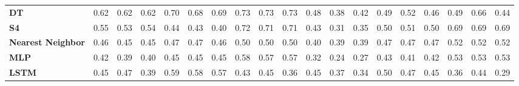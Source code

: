 \begin{table}[t]
{\begin{tabular}{l ccc ccc ccc ccc ccc ccc}
\textbf{DT} & \cellcolor[HTML]{A8D250}0.62 & \cellcolor[HTML]{A9D250}0.62 & \cellcolor[HTML]{A8D250}0.62 & \cellcolor[HTML]{77D05D}0.70 & \cellcolor[HTML]{82D05A}0.68 & \cellcolor[HTML]{7ED05B}0.69 & \cellcolor[HTML]{5FCF63}0.73 & \cellcolor[HTML]{5FCF63}0.73 & \cellcolor[HTML]{60CF62}0.73 & \cellcolor[HTML]{FFCA3F}0.48 & \cellcolor[HTML]{FFA152}0.38 & \cellcolor[HTML]{FFB24A}0.42 & \cellcolor[HTML]{FFD03D}0.49 & \cellcolor[HTML]{F0D43F}0.52 & \cellcolor[HTML]{FFC442}0.46 & \cellcolor[HTML]{FFCF3D}0.49 & \cellcolor[HTML]{8FD157}0.66 & \cellcolor[HTML]{FFB947}0.44 \\
\textbf{S4} & \cellcolor[HTML]{DBD344}0.55 & \cellcolor[HTML]{E7D341}0.53 & \cellcolor[HTML]{E3D342}0.54 & \cellcolor[HTML]{FFBC46}0.44 & \cellcolor[HTML]{FFB549}0.43 & \cellcolor[HTML]{FFAA4E}0.40 & \cellcolor[HTML]{68D060}0.72 & \cellcolor[HTML]{6BD060}0.71 & \cellcolor[HTML]{6BD060}0.71 & \cellcolor[HTML]{FFB947}0.43 & \cellcolor[HTML]{FF855F}0.31 & \cellcolor[HTML]{FF9658}0.35 & \cellcolor[HTML]{FED43B}0.50 & \cellcolor[HTML]{F8D43D}0.51 & \cellcolor[HTML]{FDD43C}0.50 & \cellcolor[HTML]{7BD05C}0.69 & \cellcolor[HTML]{7BD05C}0.69 & \cellcolor[HTML]{7DD05B}0.69 \\
\textbf{Nearest Neighbor} & \cellcolor[HTML]{FFC243}0.46 & \cellcolor[HTML]{FFBD45}0.45 & \cellcolor[HTML]{FFBE45}0.45 & \cellcolor[HTML]{FFC841}0.47 & \cellcolor[HTML]{FFC741}0.47 & \cellcolor[HTML]{FFC442}0.46 & \cellcolor[HTML]{FCD43C}0.50 & \cellcolor[HTML]{FFD33C}0.50 & \cellcolor[HTML]{FFD33B}0.50 & \cellcolor[HTML]{FFAB4E}0.40 & \cellcolor[HTML]{FFA74F}0.39 & \cellcolor[HTML]{FFA84F}0.39 & \cellcolor[HTML]{FFC542}0.47 & \cellcolor[HTML]{FFC841}0.47 & \cellcolor[HTML]{FFC642}0.47 & \cellcolor[HTML]{F1D43E}0.52 & \cellcolor[HTML]{F4D43E}0.52 & \cellcolor[HTML]{F3D43E}0.52 \\
\textbf{MLP} & \cellcolor[HTML]{FFB34A}0.42 & \cellcolor[HTML]{FFA74F}0.39 & \cellcolor[HTML]{FFAB4E}0.40 & \cellcolor[HTML]{FFBF45}0.45 & \cellcolor[HTML]{FFBE45}0.45 & \cellcolor[HTML]{FFBE45}0.45 & \cellcolor[HTML]{C9D248}0.58 & \cellcolor[HTML]{CED347}0.57 & \cellcolor[HTML]{CCD348}0.57 & \cellcolor[HTML]{FF8A5D}0.32 & \cellcolor[HTML]{FF6B6B}0.24 & \cellcolor[HTML]{FF7467}0.27 & \cellcolor[HTML]{FFB649}0.43 & \cellcolor[HTML]{FFAF4C}0.41 & \cellcolor[HTML]{FFB14B}0.42 & \cellcolor[HTML]{EDD33F}0.53 & \cellcolor[HTML]{EAD340}0.53 & \cellcolor[HTML]{EDD33F}0.53 \\
\textbf{LSTM} & \cellcolor[HTML]{FFC044}0.45 & \cellcolor[HTML]{FFC940}0.47 & \cellcolor[HTML]{FFA84F}0.39 & \cellcolor[HTML]{C3D24A}0.59 & \cellcolor[HTML]{C6D249}0.58 & \cellcolor[HTML]{CCD348}0.57 & \cellcolor[HTML]{FFB649}0.43 & \cellcolor[HTML]{FFC044}0.45 & \cellcolor[HTML]{FF9A55}0.36 & \cellcolor[HTML]{FFC044}0.45 & \cellcolor[HTML]{FF9C54}0.37 & \cellcolor[HTML]{FF915A}0.34 & \cellcolor[HTML]{FFD33C}0.50 & \cellcolor[HTML]{FFC840}0.47 & \cellcolor[HTML]{FFBF45}0.45 & \cellcolor[HTML]{FF9856}0.36 & \cellcolor[HTML]{FFBC46}0.44 & \cellcolor[HTML]{FF7E62}0.29 \\

\end{tabular}}
\end{table}
